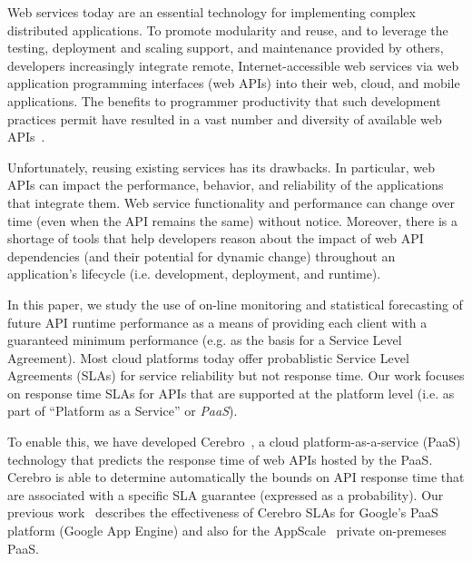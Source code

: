 Web services today are an essential technology for implementing
complex distributed applications.  To promote modularity and reuse, 
and to leverage the testing, deployment and scaling support, and maintenance 
provided by others, developers increasingly integrate remote, Internet-accessible web services 
via web application programming interfaces (web APIs)
into their web, cloud, and mobile applications.  
The benefits to programmer productivity that such development practices
permit have resulted in a vast number and diversity of available web APIs~\cite{pweb}.

Unfortunately, reusing existing services has its drawbacks. In particular, 
web APIs can impact the performance, behavior, and reliability of the applications
that integrate them.  Web service functionality and performance can change over time 
(even when the API remains the same) without notice.
Moreover, there is a shortage of tools that help developers 
reason about the impact of web API dependencies (and their potential for
dynamic change)
throughout an application's 
lifecycle (i.e. development, deployment, and runtime).  

In this paper, we study the use of on-line monitoring and statistical
forecasting of future API runtime performance as a means of providing each
client with a guaranteed minimum performance (e.g. as the basis for a Service Level
Agreement).  Most cloud platforms today offer probablistic
Service Level Agreements (SLAs) for service reliability but not response time. 
Our work focuses on response time SLAs for APIs that are supported at the
platform level (i.e. as part of ``Platform as a Service'' or \textit{PaaS}).


To enable this, we have developed Cerebro~\cite{cerebro-soccsub15},
a cloud platform-as-a-service (PaaS) technology that
predicts the response time of web APIs hosted by the PaaS.  Cerebro is able to
determine automatically the bounds on API response time that are 
associated with a specific SLA guarantee (expressed as a probability).
Our previous work~\cite{cerebro-soccsub15} describes the effectiveness of
Cerebro SLAs for Google's PaaS platform (Google
App Engine) and also for the AppScale~\cite{6488671} private on-premeses PaaS.  

